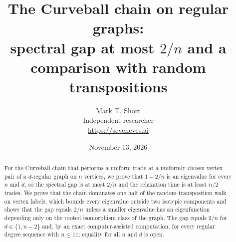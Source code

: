\documentclass[11pt]{article}
\title{The Curveball chain on regular graphs:\\spectral gap at most $2/n$ and a
comparison with random transpositions}
\author{Mark T. Short\\[2pt]\small Independent researcher\\\small\url{https://seveneves.ai}}
\date{November 13, 2026}
\numberwithin{equation}{section}
\theoremstyle{definition}
\theoremstyle{remark}
\newcommand{\NMAX}{11}
\begin{document}
\maketitle
\begin{abstract}
For the Curveball chain that performs a uniform trade at a uniformly chosen
vertex pair of a $d$-regular graph on $n$ vertices, we prove that $1-2/n$ is
an eigenvalue for every $n$ and $d$, so the spectral gap is at most $2/n$ and
the relaxation time is at least $n/2$ trades. We prove that the chain
dominates one half of the random-transposition walk on vertex labels, which
bounds every eigenvalue outside two isotypic components and shows that the
gap equals $2/n$ unless a smaller eigenvalue has an eigenfunction depending
only on the rooted isomorphism class of the graph. The gap equals $2/n$ for
$d\in\{1,n-2\}$ and, by an exact computer-assisted computation, for every
regular degree sequence with $n\le\NMAX$; equality for all $n$ and $d$ is
open.
\end{abstract}











\end{document}
